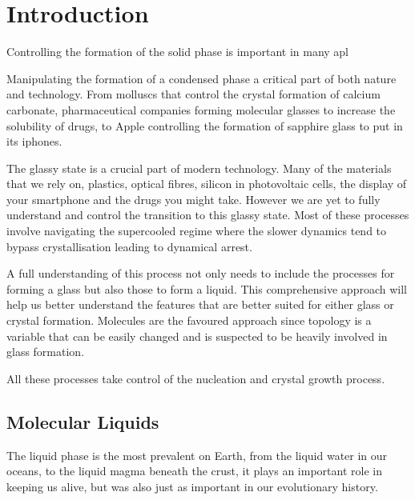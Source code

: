 
\chapter{Introduction}

Controlling the formation of the solid phase is important in many apl



Manipulating the formation of a condensed phase a critical part of both nature and technology. From molluscs that control the crystal formation of calcium carbonate, pharmaceutical companies forming molecular glasses to increase the solubility of drugs, to Apple controlling the formation of sapphire glass to put in its iphones.

The glassy state is a crucial part of modern technology. Many of the materials that we rely on, plastics, optical fibres, silicon in photovoltaic cells, the display of your smartphone and the drugs you might take. However we are yet to fully understand and control the transition to this glassy state. Most of these processes involve navigating the supercooled regime where the slower dynamics tend to bypass crystallisation leading to dynamical arrest.

A full understanding of this process not only needs to include the processes for forming a glass but also those to form a liquid. This comprehensive approach will help us better understand the features that are better suited for either glass or crystal formation. Molecules are the favoured approach since topology is a variable that can be easily changed and is suspected to be heavily involved in glass formation.



All these processes take control of the nucleation and crystal growth process.

\begin{figure}
    \caption{}
    \label{fig:}
\end{figure}

\section{Molecular Liquids}
The liquid phase is the most prevalent on Earth, from the liquid water in our oceans, to the liquid magma beneath the crust, it plays an important role in keeping us alive, but was also just as important in our evolutionary history.

